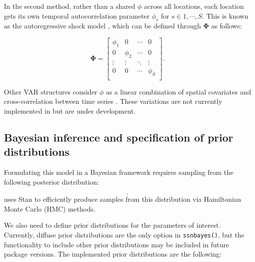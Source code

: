 
\noindent In the second method, rather than a shared $\phi$ across all locations, each location gets its own temporal autocorrelation parameter $\phi_s$ for $s \in 1, \cdots, S$.
This is known as the autoregressive shock model \citep{wikle1998hierarchical}, which can be defined through $\pmb{\Phi}$ as follows:


\begin{equation}\label{eq:case2}
\pmb{\Phi} = \begin{bmatrix}
\phi_{1} & 0 & \cdots & 0 \\ 
0 & \phi_{2} &  \cdots  & 0 \\ 
\vdots & \vdots &  \ddots & \vdots \\ 
0 & 0  & \cdots & \phi_{S} \\ 
\end{bmatrix}.
\end{equation}

Other VAR structures consider $\phi$ as a linear combination of spatial covariates and cross-correlation between time series \citep{santos2022bayesian}. These variations are not currently implemented in  but are under development. 


\subsection {Bayesian inference and specification of prior distributions}
\label{sec:prior}

Formulating this model in a Bayesian framework requires sampling from the following posterior distribution:

\begin{equation}
[\pmb{\beta},  \pmb{\Phi}, \sigma^2_{0}, \sigma^2_{u}, \alpha_{u}, \sigma^2_{d}, \alpha_{d}, \sigma^2_{e}, \alpha_{e}\mid \mathbf{y}, \mathbf{X}].
\end{equation}
 uses \textsf{Stan} \citep{carpenter2017stan} to efficiently produce samples from this distribution via Hamiltonian Monte Carlo (HMC) methods.

We also need to define prior distributions for the parameters of interest. Currently, diffuse prior distributions are the only option in \texttt{ssnbayes()}, but the functionality to include other prior distributions may be included in future package versions. 
The implemented prior distributions are the following:

